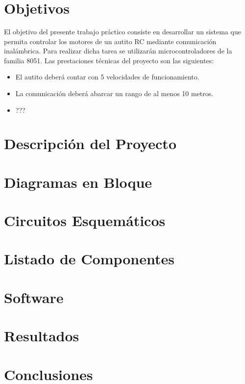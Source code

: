 \documentclass[a4paper,10pt]{article}
\title{  }
\begin{document}
	\maketitle %
	\newpage

	\tableofcontents %
	\newpage

	\section{Objetivos}
		El objetivo del presente trabajo práctico consiste en desarrollar un sistema que permita controlar los motores de un autito RC mediante comunicación 
		inalámbrica. Para realizar dicha tarea se utilizarán microcontroladores de la familia 8051. Las prestaciones técnicas del proyecto son las siguientes:
		\begin{itemize}
			\item El autito deberá contar con 5 velocidades de funcionamiento.
			\item La comunicación deberá abarcar un rango de al menos 10 metros. 
			\item ???
		\end{itemize} 

	\section{Descripción del Proyecto}
		
	\section{Diagramas en Bloque}
	\section{Circuitos Esquemáticos}
	\section{Listado de Componentes}
	\section{Software}
	\section{Resultados}
	\section{Conclusiones}
\end{document}
